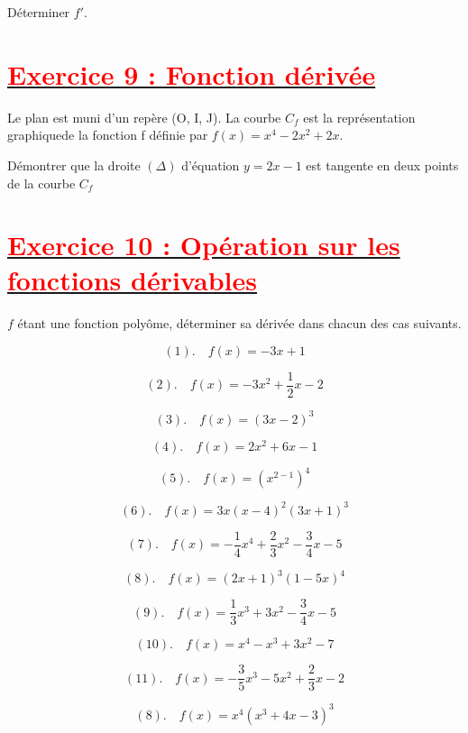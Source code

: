 \documentclass[12pt]{article}
\begin{document}
Déterminer $f'.$
\section*{\underline{\textbf{\textcolor{red}{Exercice 9 : Fonction dérivée}}}}
Le plan est muni d'un repère (O, I, J). La courbe $C_{f}$ est la représentation graphiquede la fonction f définie par $f(x)=x^{4}-2x^{2}+2x$.

Démontrer que la droite $(\Delta)$ d'équation $y=2x-1$ est tangente en deux points de la courbe $C_{f}$
\section*{\underline{\textbf{\textcolor{red}{Exercice 10 : Opération sur les fonctions dérivables}}}}
$f$ étant une fonction polyôme, déterminer sa dérivée dans chacun des cas suivants.

\[(1).\quad f(x)=-3x+1\]

\[(2).\quad f(x)=-3x^{2}+\frac{1}{2}x-2\]

\[(3).\quad f(x)=(3x-2)^{3}\]

\[(4).\quad f(x)=2x^{2}+6x-1\]

\[(5).\quad f(x)=(x^{2-1})^{4}\]

\[(6).\quad f(x)=3x(x-4)^{2}(3x+1)^{3}\]

\[(7).\quad f(x)=-\frac{1}{4}x^{4}+\frac{2}{3}x^{2}-\frac{3}{4}x-5\]

\[(8).\quad f(x)=(2x+1)^{3}(1-5x)^{4}\]

\[(9).\quad f(x)=\frac{1}{3}x^{3}+3x^{2}-\frac{3}{4}x-5\]

\[(10).\quad f(x)=x^{4}-x^{3}+3x^{2}-7\]

\[(11).\quad f(x)=-\frac{3}{5}x^{3}-5x^{2}+\frac{2}{3}x-2\]

\[(8).\quad f(x)=x^{4}(x^{3}+4x-3)^{3}\]
\end{document}
